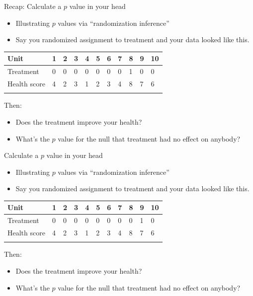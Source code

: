 \documentclass[
  11pt,
  ignorenonframetext,
]{beamer}
\providecommand{\tightlist}{%
  \setlength{\itemsep}{0pt}\setlength{\parskip}{0pt}}\usepackage{longtable,booktabs,array}
\begin{document}
\begin{frame}{Recap: Calculate a \(p\) value in your head}
\protect\hypertarget{recap-calculate-a-p-value-in-your-head}{}
\begin{itemize}
\item
  Illustrating \(p\) values via ``randomization inference''
\item
  Say you randomized assignment to treatment and your data looked like
  this.
\end{itemize}

\begin{longtable}[]{@{}lllllllllll@{}}
\toprule\noalign{}
Unit & 1 & 2 & 3 & 4 & 5 & 6 & 7 & 8 & 9 & 10 \\
\midrule\noalign{}
\endhead
Treatment & 0 & 0 & 0 & 0 & 0 & 0 & 0 & 1 & 0 & 0 \\
Health score & 4 & 2 & 3 & 1 & 2 & 3 & 4 & 8 & 7 & 6 \\
\bottomrule\noalign{}
\end{longtable}

Then:

\begin{itemize}
\tightlist
\item
  Does the treatment improve your health?
\item
  What's the \(p\) value for the null that treatment had no effect on
  anybody?
\end{itemize}
\end{frame}

\begin{frame}{Calculate a \(p\) value in your head}
\protect\hypertarget{calculate-a-p-value-in-your-head-2}{}
\begin{itemize}
\tightlist
\item
  Illustrating \(p\) values via ``randomization inference''
\item
  Say you randomized assignment to treatment and your data looked like
  this.
\end{itemize}

\begin{longtable}[]{@{}lllllllllll@{}}
\toprule\noalign{}
Unit & 1 & 2 & 3 & 4 & 5 & 6 & 7 & 8 & 9 & 10 \\
\midrule\noalign{}
\endhead
Treatment & 0 & 0 & 0 & 0 & 0 & 0 & 0 & 0 & 1 & 0 \\
Health score & 4 & 2 & 3 & 1 & 2 & 3 & 4 & 8 & 7 & 6 \\
\bottomrule\noalign{}
\end{longtable}

Then:

\begin{itemize}
\tightlist
\item
  Does the treatment improve your health?
\item
  What's the \(p\) value for the null that treatment had no effect on
  anybody?
\end{itemize}
\end{frame}
\end{document}
